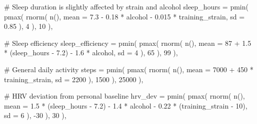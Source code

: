 \documentclass[
  letterpaper,
  DIV=11,
  numbers=noendperiod]{scrreprt}
\newenvironment{Shaded}{\begin{snugshade}}{\end{snugshade}}
\newcommand{\AttributeTok}[1]{\textcolor[rgb]{0.40,0.45,0.13}{#1}}
\newcommand{\CommentTok}[1]{\textcolor[rgb]{0.37,0.37,0.37}{#1}}
\newcommand{\DecValTok}[1]{\textcolor[rgb]{0.68,0.00,0.00}{#1}}
\newcommand{\FloatTok}[1]{\textcolor[rgb]{0.68,0.00,0.00}{#1}}
\newcommand{\FunctionTok}[1]{\textcolor[rgb]{0.28,0.35,0.67}{#1}}
\newcommand{\NormalTok}[1]{\textcolor[rgb]{0.00,0.23,0.31}{#1}}
\newcommand{\SpecialCharTok}[1]{\textcolor[rgb]{0.37,0.37,0.37}{#1}}
\begin{document}
\begin{Shaded}
\begin{Highlighting}[]
    \CommentTok{\# Sleep duration is slightly affected by strain and alcohol}
    \AttributeTok{sleep\_hours =} \FunctionTok{pmin}\NormalTok{(}
      \FunctionTok{pmax}\NormalTok{(}
        \FunctionTok{rnorm}\NormalTok{(}
          \FunctionTok{n}\NormalTok{(),}
          \AttributeTok{mean =} \FloatTok{7.3} \SpecialCharTok{{-}}
            \FloatTok{0.18} \SpecialCharTok{*}\NormalTok{ alcohol }\SpecialCharTok{{-}}
            \FloatTok{0.015} \SpecialCharTok{*}\NormalTok{ training\_strain,}
          \AttributeTok{sd =} \FloatTok{0.85}
\NormalTok{        ),}
        \DecValTok{4}
\NormalTok{      ),}
      \DecValTok{10}
\NormalTok{    ),}

    \CommentTok{\# Sleep efficiency}
    \AttributeTok{sleep\_efficiency =} \FunctionTok{pmin}\NormalTok{(}
      \FunctionTok{pmax}\NormalTok{(}
        \FunctionTok{rnorm}\NormalTok{(}
          \FunctionTok{n}\NormalTok{(),}
          \AttributeTok{mean =} \DecValTok{87} \SpecialCharTok{+}
            \FloatTok{1.5} \SpecialCharTok{*}\NormalTok{ (sleep\_hours }\SpecialCharTok{{-}} \FloatTok{7.2}\NormalTok{) }\SpecialCharTok{{-}}
            \FloatTok{1.6} \SpecialCharTok{*}\NormalTok{ alcohol,}
          \AttributeTok{sd =} \DecValTok{4}
\NormalTok{        ),}
        \DecValTok{65}
\NormalTok{      ),}
      \DecValTok{99}
\NormalTok{    ),}

    \CommentTok{\# General daily activity}
    \AttributeTok{steps =} \FunctionTok{pmin}\NormalTok{(}
      \FunctionTok{pmax}\NormalTok{(}
        \FunctionTok{rnorm}\NormalTok{(}
          \FunctionTok{n}\NormalTok{(),}
          \AttributeTok{mean =} \DecValTok{7000} \SpecialCharTok{+} \DecValTok{450} \SpecialCharTok{*}\NormalTok{ training\_strain,}
          \AttributeTok{sd =} \DecValTok{2200}
\NormalTok{        ),}
        \DecValTok{1500}
\NormalTok{      ),}
      \DecValTok{25000}
\NormalTok{    ),}

    \CommentTok{\# HRV deviation from personal baseline}
    \AttributeTok{hrv\_dev =} \FunctionTok{pmin}\NormalTok{(}
      \FunctionTok{pmax}\NormalTok{(}
        \FunctionTok{rnorm}\NormalTok{(}
          \FunctionTok{n}\NormalTok{(),}
          \AttributeTok{mean =} \FloatTok{1.5} \SpecialCharTok{*}\NormalTok{ (sleep\_hours }\SpecialCharTok{{-}} \FloatTok{7.2}\NormalTok{) }\SpecialCharTok{{-}}
            \FloatTok{1.4} \SpecialCharTok{*}\NormalTok{ alcohol }\SpecialCharTok{{-}}
            \FloatTok{0.22} \SpecialCharTok{*}\NormalTok{ (training\_strain }\SpecialCharTok{{-}} \DecValTok{10}\NormalTok{),}
          \AttributeTok{sd =} \DecValTok{6}
\NormalTok{        ),}
        \SpecialCharTok{{-}}\DecValTok{30}
\NormalTok{      ),}
      \DecValTok{30}
\NormalTok{    ),}


\end{Highlighting}
\end{Shaded}
\end{document}
